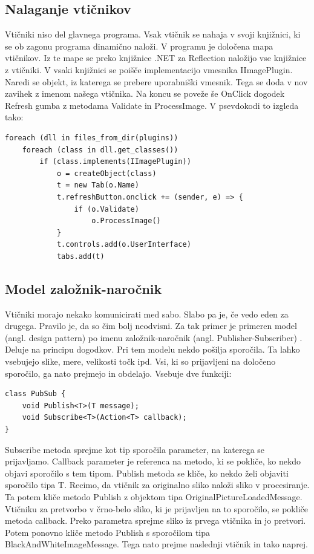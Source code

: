 \documentclass[oneside, a4paper, 12pt]{book}
\begin{document}
\subsection{Nalaganje vtičnikov}
Vtičniki niso del glavnega programa. Vsak vtičnik se nahaja v svoji 
knjižnici, ki se ob zagonu programa dinamično naloži. V programu je 
določena mapa vtičnikov. Iz te mape se preko knjižnice .NET za Reflection 
\cite{oreilly-cs} naložijo vse knjižnice z vtičniki. V vsaki knjižnici 
se poišče implementacijo vmesnika IImagePlugin. Naredi se objekt, iz 
katerega se prebere uporabniški vmesnik. Tega se doda v nov zavihek z 
imenom našega vtičnika. Na koncu se poveže še OnClick dogodek Refresh 
gumba z metodama Validate in ProcessImage. V psevdokodi to izgleda tako:
\begin{samepage}
\begin{verbatim}
foreach (dll in files_from_dir(plugins))
    foreach (class in dll.get_classes())
        if (class.implements(IImagePlugin))
            o = createObject(class)
            t = new Tab(o.Name)
            t.refreshButton.onclick += (sender, e) => {
                if (o.Validate)
                    o.ProcessImage()
            }
            t.controls.add(o.UserInterface)
            tabs.add(t)
\end{verbatim}
\end{samepage}

\subsection{Model založnik-naročnik}
Vtičniki morajo nekako komunicirati med sabo. Slabo pa je, če vedo 
eden za drugega. Pravilo je, da so čim bolj neodvisni. Za tak primer 
je primeren model (angl. design pattern) po imenu založnik-naročnik 
(angl. Publisher-Subscriber) \cite{oreilly-dp, oreilly-cs}. Deluje na 
principu dogodkov. Pri tem modelu nekdo pošilja sporočila. Ta lahko 
vsebujejo slike, mere, velikosti točk ipd. Vsi, ki so prijavljeni na 
določeno sporočilo, ga nato prejmejo in obdelajo. Vsebuje dve funkciji:
\begin{samepage}
\begin{verbatim}
class PubSub {
    void Publish<T>(T message);
    void Subscribe<T>(Action<T> callback);
}
\end{verbatim}
\end{samepage}
Subscribe metoda sprejme kot tip sporočila parameter, na katerega se 
prijavljamo. Callback parameter je referenca na metodo, ki se pokliče, 
ko nekdo objavi sporočilo s tem tipom. Publish metoda se kliče, ko nekdo 
želi objaviti sporočilo tipa T. Recimo, da vtičnik za originalno sliko 
naloži sliko v procesiranje. Ta potem kliče metodo Publish z objektom 
tipa OriginalPictureLoadedMessage. Vtičniku za pretvorbo v črno-belo 
sliko, ki je prijavljen na to sporočilo, se pokliče metoda callback. 
Preko parametra sprejme sliko iz prvega vtičnika in jo pretvori. Potem 
ponovno kliče metodo Publish s sporočilom tipa 
Black\-And\-White\-Image\-Message. Tega nato prejme naslednji vtičnik 
in tako naprej.
\end{document}
